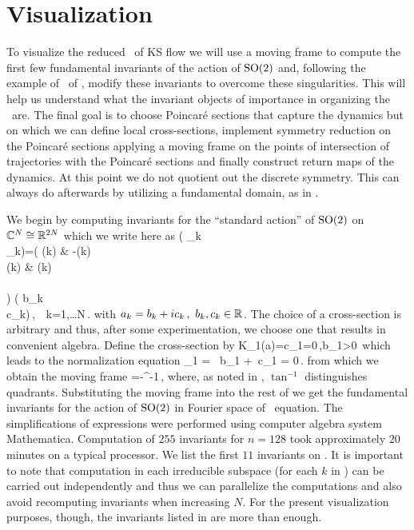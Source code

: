 \section{Visualization}
\label{sec:KSeMF}

To visualize the reduced \statesp\ of KS flow we will use a
moving frame to compute the first few fundamental invariants
of the action of $\mathrm{SO}(2)$ and, following the example of
\CLe\ of , modify these invariants to
overcome these singularities. This will help us understand
what the invariant objects of importance in organizing the
\statesp\ are. The final goal is to choose Poincar\'e
sections that capture the dynamics but on which we can define
local cross-sections, implement symmetry reduction on the
Poincar\'e sections applying a moving frame on the points of
intersection of trajectories with the Poincar\'e sections and
finally construct return maps of the dynamics. At
this point we do not quotient out the discrete symmetry. This
can always do afterwards by utilizing a fundamental domain,
as in .


We begin by computing invariants for the ``standard action''
 of $\mathrm{SO}(2)$ on $\mathbb{C}^{N}\cong\mathbb{R}^{2N}$
which we write here as
\beq
	\left( _k \\ _k\earr \right)=\left(
			    			\cos(k\theta) & -\sin(k\theta)\\
						\sin(k\theta) & \cos(k\theta)\\
			   			\earr\\	
						\right) \left( b_k \\ c_k\earr\right)\,,\ \ k=1,\ldots N\,.
	\label{eq:SO2stand}
\eeq
with $a_k=b_k+i c_k\,,\ b_k,c_k\in\mathbb{R}^{}$.
The choice of a cross-section is arbitrary and thus, after some
experimentation, we choose one that results in convenient
algebra.
Define the cross-section by
\beq
 	K_1(a)=c_1=0\,,\qquad b_1>0\,
\eeq
which leads to the normalization equation
\beq
	_1 = \sin\theta\, b_1 +\cos\theta\, c_1 = 0\,.
	\label{eq:SO2norm}
\eeq
from which we obtain the moving frame
\beq
	\theta=-\tan^{-1}\,,
	\label{eq:SO2stand}
\eeq
where, as noted in , $\tan^{-1}$ distinguishes quadrants.
Substituting the moving frame into the rest of  we get the fundamental invariants for the action
of $\mathrm{SO}(2)$ in Fourier space of \KS\ equation. The simplifications of expressions were performed using computer algebra system Mathematica. Computation of $255$ invariants for $n=128$ took approximately $20$ minutes on a typical processor.
We list the first $11$ invariants on . It is important to note that computation in each irreducible
subspace (for each $k$ in ) can be carried out independently and thus we can parallelize the computations
and also avoid recomputing invariants when increasing $N$. For the present visualization purposes, though, the  invariants
listed in  are more than enough.


